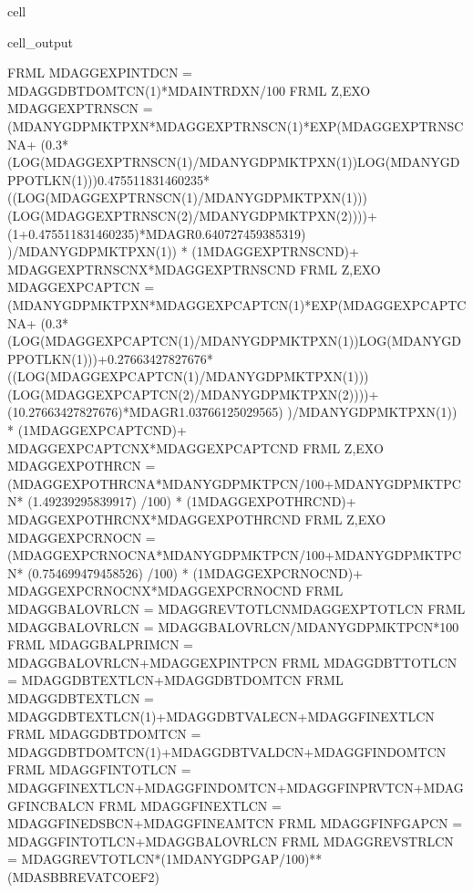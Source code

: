 \documentclass[letterpaper,10pt,english]{jupyterBook}
\begin{document}
\begin{sphinxuseclass}{cell}
\begin{sphinxVerbatimOutput}
\begin{sphinxuseclass}{cell_output}
\begin{sphinxVerbatim}[commandchars=\\\{\}]
FRML  \PYGZlt{}\PYGZgt{} MDAGGEXPINTDCN = MDAGGDBTDOMTCN(\PYGZhy{}1)*MDAINTRDXN/100 \PYGZdl{}
FRML \PYGZlt{}Z,EXO\PYGZgt{} MDAGGEXPTRNSCN = (MDANYGDPMKTPXN*MDAGGEXPTRNSCN(\PYGZhy{}1)*EXP(MDAGGEXPTRNSCN\PYGZus{}A+ (\PYGZhy{}0.3*(LOG(MDAGGEXPTRNSCN(\PYGZhy{}1)/MDANYGDPMKTPXN(\PYGZhy{}1))\PYGZhy{}LOG(MDANYGDPPOTLKN(\PYGZhy{}1)))\PYGZhy{}0.475511831460235*((LOG(MDAGGEXPTRNSCN(\PYGZhy{}1)/MDANYGDPMKTPXN(\PYGZhy{}1)))\PYGZhy{}(LOG(MDAGGEXPTRNSCN(\PYGZhy{}2)/MDANYGDPMKTPXN(\PYGZhy{}2))))+(1+0.475511831460235)*MDAGR\PYGZhy{}0.640727459385319) )/MDANYGDPMKTPXN(\PYGZhy{}1)) * (1\PYGZhy{}MDAGGEXPTRNSCN\PYGZus{}D)+ MDAGGEXPTRNSCN\PYGZus{}X*MDAGGEXPTRNSCN\PYGZus{}D  \PYGZdl{}
FRML \PYGZlt{}Z,EXO\PYGZgt{} MDAGGEXPCAPTCN = (MDANYGDPMKTPXN*MDAGGEXPCAPTCN(\PYGZhy{}1)*EXP(MDAGGEXPCAPTCN\PYGZus{}A+ (\PYGZhy{}0.3*(LOG(MDAGGEXPCAPTCN(\PYGZhy{}1)/MDANYGDPMKTPXN(\PYGZhy{}1))\PYGZhy{}LOG(MDANYGDPPOTLKN(\PYGZhy{}1)))+0.27663427827676*((LOG(MDAGGEXPCAPTCN(\PYGZhy{}1)/MDANYGDPMKTPXN(\PYGZhy{}1)))\PYGZhy{}(LOG(MDAGGEXPCAPTCN(\PYGZhy{}2)/MDANYGDPMKTPXN(\PYGZhy{}2))))+(1\PYGZhy{}0.27663427827676)*MDAGR\PYGZhy{}1.03766125029565) )/MDANYGDPMKTPXN(\PYGZhy{}1)) * (1\PYGZhy{}MDAGGEXPCAPTCN\PYGZus{}D)+ MDAGGEXPCAPTCN\PYGZus{}X*MDAGGEXPCAPTCN\PYGZus{}D  \PYGZdl{}
FRML \PYGZlt{}Z,EXO\PYGZgt{} MDAGGEXPOTHRCN = (MDAGGEXPOTHRCN\PYGZus{}A*MDANYGDPMKTPCN/100+MDANYGDPMKTPCN* (1.49239295839917) /100) * (1\PYGZhy{}MDAGGEXPOTHRCN\PYGZus{}D)+ MDAGGEXPOTHRCN\PYGZus{}X*MDAGGEXPOTHRCN\PYGZus{}D  \PYGZdl{}
FRML \PYGZlt{}Z,EXO\PYGZgt{} MDAGGEXPCRNOCN = (MDAGGEXPCRNOCN\PYGZus{}A*MDANYGDPMKTPCN/100+MDANYGDPMKTPCN* (0.754699479458526) /100) * (1\PYGZhy{}MDAGGEXPCRNOCN\PYGZus{}D)+ MDAGGEXPCRNOCN\PYGZus{}X*MDAGGEXPCRNOCN\PYGZus{}D  \PYGZdl{}
FRML  \PYGZlt{}\PYGZgt{} MDAGGBALOVRLCN = MDAGGREVTOTLCN\PYGZhy{}MDAGGEXPTOTLCN \PYGZdl{}
FRML  \PYGZlt{}\PYGZgt{} MDAGGBALOVRLCN\PYGZus{} = MDAGGBALOVRLCN/MDANYGDPMKTPCN*100 \PYGZdl{}
FRML  \PYGZlt{}\PYGZgt{} MDAGGBALPRIMCN = MDAGGBALOVRLCN+MDAGGEXPINTPCN \PYGZdl{}
FRML  \PYGZlt{}\PYGZgt{} MDAGGDBTTOTLCN = MDAGGDBTEXTLCN+MDAGGDBTDOMTCN \PYGZdl{}
FRML  \PYGZlt{}\PYGZgt{} MDAGGDBTEXTLCN = MDAGGDBTEXTLCN(\PYGZhy{}1)+MDAGGDBTVALECN+MDAGGFINEXTLCN \PYGZdl{}
FRML  \PYGZlt{}\PYGZgt{} MDAGGDBTDOMTCN = MDAGGDBTDOMTCN(\PYGZhy{}1)+MDAGGDBTVALDCN+MDAGGFINDOMTCN \PYGZdl{}
FRML  \PYGZlt{}\PYGZgt{} MDAGGFINTOTLCN = MDAGGFINEXTLCN+MDAGGFINDOMTCN+MDAGGFINPRVTCN+MDAGGFINCBALCN \PYGZdl{}
FRML  \PYGZlt{}\PYGZgt{} MDAGGFINEXTLCN = MDAGGFINEDSBCN+MDAGGFINEAMTCN \PYGZdl{}
FRML  \PYGZlt{}\PYGZgt{} MDAGGFINFGAPCN = MDAGGFINTOTLCN+MDAGGBALOVRLCN \PYGZdl{}
FRML  \PYGZlt{}\PYGZgt{} MDAGGREVSTRLCN = MDAGGREVTOTLCN*(1\PYGZhy{}MDANYGDPGAP\PYGZus{}/100)**(\PYGZus{}MDASBBREV\PYGZus{}AT\PYGZus{}COEF\PYGZus{}2) \PYGZdl{}

\end{sphinxVerbatim}
\end{sphinxuseclass}
\end{sphinxVerbatimOutput}
\end{sphinxuseclass}
\end{document}
